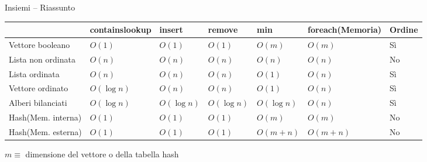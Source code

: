 \begin{frame}[shrink=20]{Insiemi -- Riassunto}
	
\renewcommand{\arraystretch}{1.3}

\begin{tabular}{|P{3.1cm}|P{1.5cm}|P{1.5cm}|P{1.5cm}|P{1.5cm}|P{1.7cm}|P{1.3cm}|}	
\hline
& \textsf{contains}\newline\textsf{lookup} & \textsf{insert} & \textsf{remove} & \textsf{min} & \textsf{foreach}\newline (Memoria) & Ordine \\
\hline
Vettore booleano & $O(1)$ & $O(1)$ & $O(1)$ & $O(m)$ & $O(m)$ & Sì \\\hline
Lista non ordinata & $O(n)$ & $O(n)$ & $O(n)$ & $O(n)$ & $O(n)$ & No\\\hline
Lista ordinata & $O(n)$ & $O(n)$ & $O(n)$ & $O(1)$ & $O(n)$ & Sì\\\hline
Vettore ordinato & $O(\log n)$ & $O(n)$ & $O(n)$ & $O(1)$ & $O(n)$ & Sì\\\hline
Alberi bilanciati & $O(\log n)$ & $O(\log n)$ & $O(\log n)$ & $O(\log n)$ & $O(n)$ & Sì \\\hline
Hash\newline (Mem. interna) & $O(1)$ & $O(1)$ & $O(1)$ & $O(m)$ & $O(m)$ & No\\\hline
Hash\newline (Mem. esterna) & $O(1)$ & $O(1)$ & $O(1)$ & $O(m+n)$ & $O(m+n)$ & No \\\hline
\end{tabular}
	
\bigskip
$m \equiv$ dimensione del vettore o della tabella hash
	
\end{frame}



